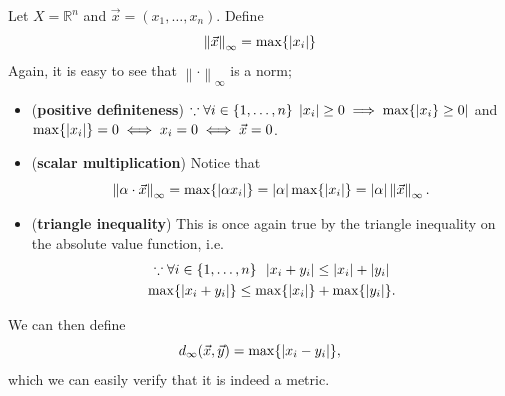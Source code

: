 \documentclass[notoc,notitlepage]{tufte-book}
\newcommand{\norm}[1]{\left\| #1 \right\|}
\begin{document}
\begin{eg}
  Let $X = \mathbb{R}^n$ and $\vec{x} = ( x_1, \ldots, x_n )$. Define
  \begin{equation*}
    \norm{\vec{x}}_\infty = \max \{ \abs{x_i} \}
  \end{equation*}
  Again, it is easy to see that $\norm\cdot_\infty$ is a norm;
  \begin{itemize}
    \item (\textbf{positive definiteness}) $\because \forall i \in \{ 1, \ldots, n \} \; \left|x_i\right| \geq 0 \implies \max \{ \left|x_i \} \geq 0\right|$ and $\max \{ \left|x_i\right| \} = 0 \iff x_i = 0 \iff \vec{x} = 0$.
    \item (\textbf{scalar multiplication}) Notice that
      \begin{equation*}
        \norm{\alpha \cdot \vec{x}}_\infty = \max \{ \abs{\alpha x_i} \} = \abs{\alpha} \max \{ \abs{x_i} \} = \abs{\alpha} \norm{\vec{x}}_\infty.
      \end{equation*}
    \item (\textbf{triangle inequality}) This is once again true by the triangle inequality on the absolute value function, i.e.
      \begin{gather*}
        \because \forall i \in \{ 1, \ldots, n \} \enspace \left|x_i + y_i\right| \leq \left|x_i\right| + \left|y_i\right| \\
        \max \{ \left|x_i + y_i\right| \} \leq \max \{ \left|x_i\right| \} + \max \{ \left|y_i\right| \}.
      \end{gather*}
  \end{itemize}
  We can then define
  \begin{equation*}
    d_\infty(\vec{x}, \vec{y}) = \max \{ \left|x_i - y_i\right| \},
  \end{equation*}
  which we can easily verify that it is indeed a metric.
\end{eg}
\end{document}
